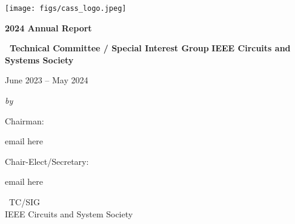 \documentclass{article}
\begin{document}

\begin{center}
\vspace*{3\baselineskip}

\texttt{[image: figs/cass\_logo.jpeg]}\\
\vfill

{\huge \textbf{2024 Annual Report}}

\vspace*{3\baselineskip}

{\LARGE \textbf{\TCNAME \ Technical Committee / Special Interest Group}}
{\LARGE \textbf{IEEE Circuits and Systems Society}}

\begin{large}
\vspace*{2\baselineskip}

June 2023 – May 2024

\vspace*{2\baselineskip}

\emph{by} \\[1ex]
{\Large Chairman: \CHAIRNAME \\ \par} %
{{ email here}}\\[0.5cm] %
{\Large Chair-Elect/Secretary: \CHAIRELECTNAME \\ \par} %
{{ email here}}\\[2cm] %

\vspace*{4\baselineskip}

{\TCFULLNAME \ TC/SIG}\\
{\large IEEE Circuits and System Society}\par %

\thispagestyle{empty} 

\end{large}
\end{center}
\pagebreak



\end{document}
